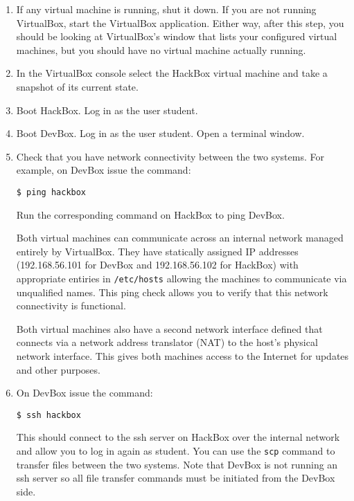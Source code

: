\documentclass[twocolumn]{article}
\begin{document}
\begin{enumerate}

\item If any virtual machine is running, shut it down. If you are not running VirtualBox, start
  the VirtualBox application. Either way, after this step, you should be looking at VirtualBox's
  window that lists your configured virtual machines, but you should have no virtual machine
  actually running.

\item In the VirtualBox console select the HackBox virtual machine and take a snapshot of its
  current state.

\item Boot HackBox. Log in as the user student.

\item Boot DevBox. Log in as the user student. Open a terminal window.

\item Check that you have network connectivity between the two systems. For example, on DevBox
  issue the command:
\begin{Verbatim}
$ ping hackbox
\end{Verbatim}
  Run the corresponding command on HackBox to ping DevBox.

  Both virtual machines can communicate across an internal network managed entirely by
  VirtualBox. They have statically assigned IP addresses (192.168.56.101 for DevBox and
  192.168.56.102 for HackBox) with appropriate entiries in \texttt{/etc/hosts} allowing the
  machines to communicate via unqualified names. This ping check allows you to verify that this
  network connectivity is functional.

  Both virtual machines also have a second network interface defined that connects via a network
  address translator (NAT) to the host's physical network interface. This gives both machines
  access to the Internet for updates and other purposes.

\item On DevBox issue the command:
\begin{Verbatim}
$ ssh hackbox
\end{Verbatim}
  This should connect to the ssh server on HackBox over the internal network and allow you to
  log in again as student. You can use the \texttt{scp} command to transfer files between the
  two systems. Note that DevBox is not running an ssh server so all file transfer commands must
  be initiated from the DevBox side.


\end{enumerate}
\end{document}
